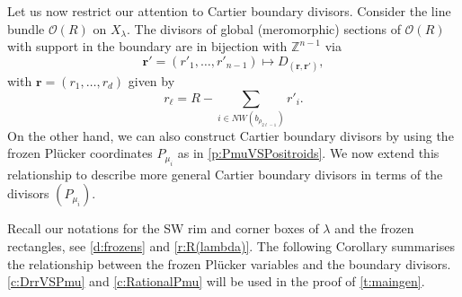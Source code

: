 \documentclass{amsart}
\theoremstyle{definition}
\numberwithin{equation}{section}
\newcommand{\Z}{\mathbb{Z}}
\begin{document}
Let us now restrict our attention to Cartier boundary divisors. Consider the line bundle $\mathcal O(R)$ on $X_\lambda$. The divisors of global (meromorphic) sections of $\mathcal O(R)$ with support in the boundary are in bijection with $\Z^{n-1}$ via
\[
\mathbf r'=(r'_1,\dotsc, r'_{n-1})\mapsto D_{(\mathbf r,\mathbf r')},
\] 
with $\mathbf r=(r_1,\dotsc, r_d)$ given by 
\begin{equation}\label{e:Cartier-rviaR}
r_\ell=R-\sum_{i\in NW(b_{\rho_{2\ell-1}})}r'_i. 
\end{equation}
On the other hand, we can also construct Cartier boundary divisors  by using the frozen Pl\"ucker coordinates $P_{\mu_i}$ as in \cref{p:PmuVSPositroids}. We now extend this relationship to describe more general Cartier boundary divisors in terms of the divisors $(P_{\mu_i})$.  




Recall our notations for the SW rim and corner boxes of $\lambda$ and the frozen rectangles, see \cref{d:frozens} and \cref{r:R(lambda)}. The following Corollary summarises the relationship between the frozen Pl\"ucker variables and the boundary divisors.  
\cref{c:DrrVSPmu} and 
	\cref{c:RationalPmu}
will be used in the proof of \cref{t:maingen}.
\end{document}
